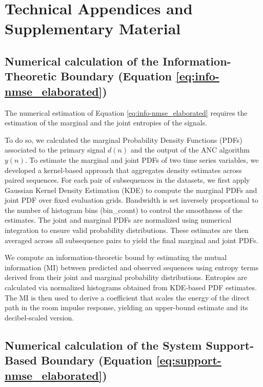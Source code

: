 \documentclass{article}
\begin{document}
\clearpage
 




\newpage


\appendix

\section{Technical Appendices and Supplementary Material}

\subsection{Numerical calculation of the Information-Theoretic Boundary (Equation \ref{eq:info-nmse_elaborated})} \label{sec:MI_appendix_sec}

The numerical estimation of Equation \ref{eq:info-nmse_elaborated} requires the estimation of the marginal and the joint entropies of the signals. 

To do so, we calculated the marginal Probability Density Functions (PDFs) associated to the primary signal $d(n)$ and the output of the ANC algorithm $y(n)$. To estimate the marginal and joint PDFs of two time series variables, we developed a kernel-based approach that aggregates density estimates across paired sequences. For each pair of subsequences in the datasets, we first apply Gaussian Kernel Density Estimation (KDE) to compute the marginal PDFs and joint PDF over fixed evaluation grids. Bandwidth is set inversely proportional to the number of histogram bins (bin\_count) to control the smoothness of the estimates. The joint and marginal PDFs are normalized using numerical integration to ensure valid probability distributions. These estimates are then averaged across all subsequence pairs to yield the final marginal and joint PDFs. 

We compute an information-theoretic bound by estimating the mutual information (MI) between predicted and observed sequences using entropy terms derived from their joint and marginal probability distributions. Entropies are calculated via normalized histograms obtained from KDE-based PDF estimates. The MI is then used to derive a coefficient that scales the energy of the direct path in the room impulse response, yielding an upper-bound estimate and its decibel-scaled version.


\subsection{Numerical calculation of the System Support-Based Boundary (Equation \ref{eq:support-nmse_elaborated})} \label{sec:sup_appendix_sec}
\end{document}

